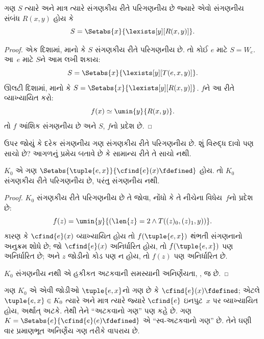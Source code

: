 \begin{thm}
ગણ $S$ ત્યારે અને માત્ર ત્યારે સંગણકીય રીતે પરિગણનીય છે
જ્યારે એવો સંગણનીય સંબંધ $R(x,y)$ હોય કે
\[
S = \Setabs{ x }{ \lexists[y][R(x,y)] }.
\]
\end{thm}

\begin{proof}
એક દિશામાં, માનો કે $S$ સંગણકીય રીતે પરિગણનીય છે.
તો કોઈ $e$ માટે $S = W_e$. આ~$e$ માટે $S$ને આમ લખી શકાય:
\[
S = \Setabs{ x }{ \lexists[y][T(e, x, y)] }.
\]
ઊલટી દિશામાં, માનો કે $S = \Setabs{ x }{
  \lexists[y][R(x, y)] }$. $f$ને આ રીતે વ્યાખ્યાયિત કરો:
\[
f(x) \simeq \umin{y}{R(x, y)}.
\]
તો $f$ આંશિક સંગણનીય છે અને $S$, $f$નો પ્રદેશ છે.
\end{proof}
\endgroup


\begingroup
\makeatletter{}\makeatother

\label{guunit:OLP-0240}



ઉપર જોયું કે દરેક સંગણનીય ગણ સંગણકીય રીતે પરિગણનીય છે. શું
વિરુદ્ધ દાવો પણ સાચો છે? આગળનું પ્રમેય બતાવે છે કે સામાન્ય રીતે
તે સાચો નથી.

\begin{thm}
$K_0$ એ ગણ $\Setabs{\tuple{e, x}}{\cfind{e}(x) \fdefined}$ હોય.
તો $K_0$ સંગણકીય રીતે પરિગણનીય છે, પરંતુ સંગણનીય નથી.
\end{thm}

\begin{proof}
$K_0$ સંગણકીય રીતે પરિગણનીય છે તે જોવા, નોંધો કે તે નીચેના
વિધેય~$f$નો પ્રદેશ છે:
\[
f(z) = \umin{y}{(\len{z} = 2 \land T((z)_0, (z)_1, y))}.
\]
કારણ કે $\cfind{e}(x)$ વ્યાખ્યાયિત હોય તો
$f(\tuple{e, x})$ થંભતી સંગણનાનો અનુક્રમ શોધે છે; જો
$\cfind{e}(x)$ અનિર્ધારિત હોય, તો $f(\tuple{e, x})$ પણ
અનિર્ધારિત છે; અને $z$ જોડીનો કોડ પણ ન હોય, તો $f(z)$ પણ
અનિર્ધારિત છે.

$K_0$ સંગણનીય નથી એ હકીકત અટકવાની સમસ્યાની અનિર્ણેયતા,
, જ છે.
\end{proof}

ગણ $K_0$ એ એવી જોડીઓ $\tuple{e,x}$નો ગણ છે કે
$\cfind{e}(x) \fdefined$; એટલે $\tuple{e,x} \in K_0$ ત્યારે
અને માત્ર ત્યારે જ્યારે $\cfind{e}$ ઇનપુટ~$x$ પર વ્યાખ્યાયિત
હોય, અર્થાત્ અટકે. તેથી તેને ``અટકવાનો ગણ'' પણ કહે છે.
ગણ $K = \Setabs{e}{\cfind{e}(e) \fdefined}$ એ
``સ્વ-અટકવાનો ગણ'' છે. તેને ઘણી વાર પ્રમાણભૂત અનિર્ણેય ગણ
તરીકે વાપરાય છે.

